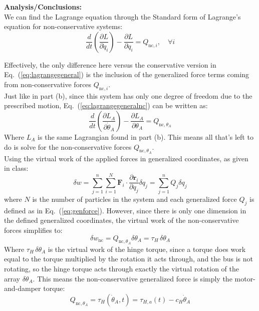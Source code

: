 \documentclass[titlepage]{article}
\begin{document}
\textbf{Analysis/Conclusions:}\\
We can find the Lagrange equation through the Standard form of Lagrange's equation for non-conservative systems:
\begin{equation}
	\frac{d}{dt}\left(\frac{\partial L}{\partial\dot{q}_i}\right)-\frac{\partial L}{\partial q_i}=Q_{\text{nc},i},\quad\forall i
	\label{eq:lagrangegeneralnc}
\end{equation}

Effectively, the only difference here versus the conservative version in Eq.~(\ref{eq:lagrangegeneral}) is the inclusion of the generalized force terms coming from non-conservative forces $Q_{\text{nc},i}$.\\

Just like in part (b), since this system has only one degree of freedom due to the prescribed motion, Eq.~(\ref{eq:lagrangegeneralnc}) can be written as:
\begin{equation}
	\frac{d}{dt}\left(\frac{\partial L_A}{\partial\dot{\theta}_A}\right)-\frac{\partial L_A}{\partial\theta_A}=Q_{\text{nc},\theta_A}
	\label{eq:lagrangegstandardnc}
\end{equation}
Where $L_A$ is the same Lagrangian found in part (b). This means all that's left to do is solve for the non-conservative forces $Q_{\text{nc},\theta_A}$.\\

Using the virtual work of the applied forces in generalized coordinates, as given in class:
\begin{equation}
	\delta w=\sum_{j=1}^{n}\sum_{i=1}^{N}\boldsymbol{F}_i\cdot\frac{\partial\boldsymbol{r}_i}{\partial q_j}\delta q_j=\sum_{j=1}^{n}Q_j\delta q_j
	\label{eq:virtualwork}
\end{equation}
where $N$ is the number of particles in the system and each generalized force $Q_j$ is defined as in Eq.~(\ref{eq:genforce}). However, since there is only one dimension in the defined generalized coordinates, the virtual work of the non-conservative forces simplifies to:
\begin{equation}
	\delta w_{\text{nc}}=Q_{\text{nc},\theta_A}\delta\theta_A=\tau_H\,\delta\theta_A
\end{equation}
Where $\tau_H\,\delta\theta_A$ is the virtual work of the hinge torque, since a torque does work equal to the torque multiplied by the rotation it acts through, and the bus is not rotating, so the hinge torque acts through exactly the virtual rotation of the array $\delta\theta_A$. This means the non-conservative generalized force is simply the motor-and-damper torque:
\begin{equation}
	Q_{\text{nc},\theta_A}=\tau_H(\dot{\theta}_A,t)=\tau_{H,a}(t)-c_H\dot{\theta}_A
\end{equation}
\end{document}
